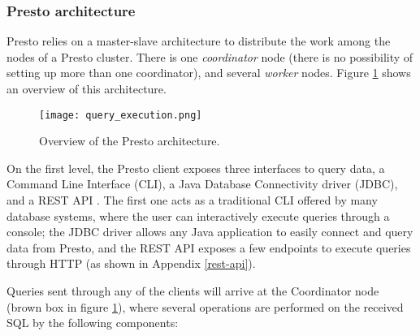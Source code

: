\documentclass[conference]{IEEEtran}
\begin{document}
\subsubsection{Presto architecture} \label{arch}
Presto relies on a master-slave architecture to distribute the work among the nodes of a Presto cluster. There is one \textit{coordinator} node (there is no possibility of setting up more than one coordinator), and several \textit{worker} nodes. Figure \ref{architecture} shows an overview of this architecture.

\begin{figure}[htbp]
\centerline{\texttt{[image: query\_execution.png]}}
\caption{Overview of the Presto architecture.}
\label{architecture}
\end{figure}

On the first level, the Presto client exposes three interfaces to query data, a Command Line Interface (CLI), a Java Database Connectivity driver (JDBC), and a REST API \cite{sethi-2019}. The first one acts as a traditional CLI offered by many database systems, where the user can interactively execute queries through a console; the JDBC driver allows any Java application to easily connect and query data from Presto, and the REST API exposes a few endpoints to execute queries through HTTP (as shown in Appendix \ref{rest-api}).

Queries sent through any of the clients will arrive at the Coordinator node (brown box in figure \ref{architecture}), where several operations are performed on the received SQL by the following components: \cite{sethi-2019}
\end{document}
